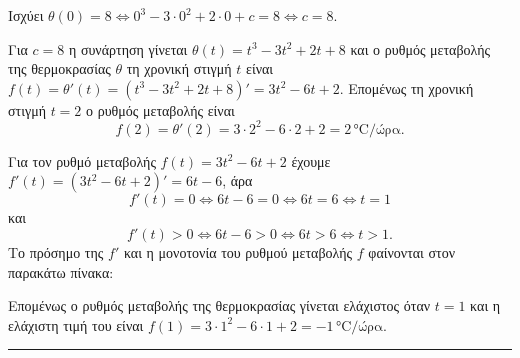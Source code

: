 \begin{alist}
    \item Ισχύει $\theta(0)=8 \Leftrightarrow 0^3-3 \cdot 0^2+2 \cdot 0+c=8 \Leftrightarrow c=8$.
    
    \item Για $c=8$ η συνάρτηση γίνεται $\theta(t)=t^3-3t^2+2t+8$ και ο ρυθμός μεταβολής της θερμοκρασίας $\theta$ τη χρονική στιγμή $t$ είναι $f(t)=\theta'(t)=(t^3-3t^2+2t+8)'=3t^2-6t+2$.
    Επομένως τη χρονική στιγμή $t=2$ ο ρυθμός μεταβολής είναι
    \[ f(2)=\theta'(2)=3 \cdot 2^2-6 \cdot 2+2=2 \, \text{°C/ώρα}. \]
    
    \item Για τον ρυθμό μεταβολής $f(t)=3t^2-6t+2$ έχουμε $f'(t)=(3t^2-6t+2)'=6t-6$, άρα
    \[ f'(t)=0 \Leftrightarrow 6t-6=0 \Leftrightarrow 6t=6 \Leftrightarrow t=1 \]
    και
    \[ f'(t)>0 \Leftrightarrow 6t-6>0 \Leftrightarrow 6t>6 \Leftrightarrow t>1. \]
    Το πρόσημο της $f'$ και η μονοτονία του ρυθμού μεταβολής $f$ φαίνονται στον παρακάτω πίνακα:
    \begin{center}
    \end{center}
    Επομένως ο ρυθμός μεταβολής της θερμοκρασίας γίνεται ελάχιστος όταν $t=1$ και η ελάχιστη τιμή του είναι $f(1)=3 \cdot 1^2 - 6 \cdot 1 + 2 = -1 \, \text{°C/ώρα}$.
\end{alist}
\vspace{6mm}
\noindent\rule{\textwidth}{0.4pt}
\vspace{6mm}

